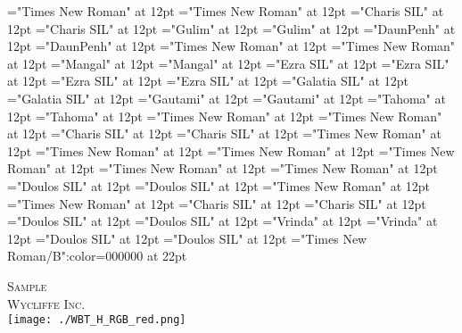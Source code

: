 \documentclass[c5paper,twoside]{article}
\begin{document}
\font\spanlv="Times New Roman" at 12pt
\font\divlv="Times New Roman" at 12pt
\font\spankup="Charis SIL" at 12pt
\font\divkup="Charis SIL" at 12pt
\font\spanko="Gulim" at 12pt
\font\divko="Gulim" at 12pt
\font\spankm="DaunPenh" at 12pt
\font\divkm="DaunPenh" at 12pt
\font\spanid="Times New Roman" at 12pt
\font\divid="Times New Roman" at 12pt
\font\spanhi="Mangal" at 12pt
\font\divhi="Mangal" at 12pt
\font\spanhe="Ezra SIL" at 12pt
\font\divhe="Ezra SIL" at 12pt
\font\spanhbo="Ezra SIL" at 12pt
\font\divhbo="Ezra SIL" at 12pt
\font\spangrc="Galatia SIL" at 12pt
\font\divgrc="Galatia SIL" at 12pt
\font\spanggoTeluIN="Gautami" at 12pt
\font\divggoTeluIN="Gautami" at 12pt
\font\spanggofonipaxemic="Tahoma" at 12pt
\font\divggofonipaxemic="Tahoma" at 12pt
\font\spanfr="Times New Roman" at 12pt
\font\divfr="Times New Roman" at 12pt
\font\spanfrZxxxxaudio="Charis SIL" at 12pt
\font\divfrZxxxxaudio="Charis SIL" at 12pt
\font\spanfa="Times New Roman" at 12pt
\font\divfa="Times New Roman" at 12pt
\font\spanes="Times New Roman" at 12pt
\font\dives="Times New Roman" at 12pt
\font\spanen="Times New Roman" at 12pt
\font\diven="Times New Roman" at 12pt
\font\spanenfonipa="Doulos SIL" at 12pt
\font\divenfonipa="Doulos SIL" at 12pt
\font\spande="Times New Roman" at 12pt
\font\divde="Times New Roman" at 12pt
\font\spanbzh="Charis SIL" at 12pt
\font\divbzh="Charis SIL" at 12pt
\font\spanbzhfonipa="Doulos SIL" at 12pt
\font\divbzhfonipa="Doulos SIL" at 12pt
\font\spanbn="Vrinda" at 12pt
\font\divbn="Vrinda" at 12pt
\font\spanbdu="Doulos SIL" at 12pt
\font\divbdu="Doulos SIL" at 12pt
\color{black} 
\thispagestyle{empty} 
\font\CoverPageHeading="Times New Roman/B":color=000000 at 22pt 
\vskip 60pt 
\begin{center} 
\end{center} 
\newpage 
\newpage 
\thispagestyle{empty} 
\mbox{} 
\begin{titlepage}
\begin{center}
\textsc{\LARGE Sample}\\[1.5cm] 
\vspace{140 mm} 
\textsc{Wycliffe Inc.}\\[0.5cm] 
\texttt{[image: ./WBT\_H\_RGB\_red.png]}\\[1cm]    
\end{center} 
\end{titlepage} 
\newpage 
\newpage 
\mbox{} 
\setcounter{page}{1} 
 
\pagestyle{plain} 
\newpage 
\newpage 
\thispagestyle{empty} 
\mbox{} 
\end{document}
